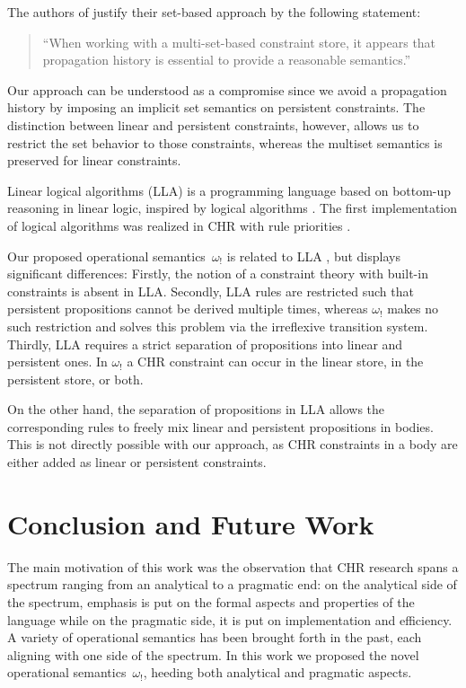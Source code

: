 \documentclass{tlp}
\newcommand{\bang}{\ensuremath{!}}
\newcommand{\obang}{\ensuremath{{\omega_\bang}}}
\begin{document}
The authors of \cite{Sarna-Starosta2007} justify their set-based approach by the
following statement:
\begin{quotation} 
``When working with a multi-set-based constraint store, it appears that
propagation history is essential to provide a reasonable semantics.''
\end{quotation}
Our approach can be understood as a compromise since we avoid
a propagation history by imposing an implicit set semantics on persistent
constraints. The distinction between linear and persistent
constraints, however, allows us to restrict the set behavior to those
constraints, whereas the multiset semantics is
preserved for linear constraints.

Linear logical algorithms \cite{Simmons2008} (LLA) is a programming language
based on bottom-up reasoning in linear logic, inspired by logical algorithms
\cite{Ganzinger2002}. The first implementation of logical algorithms was realized
in CHR with rule priorities \cite{DeKoninck2009}. 

Our proposed operational semantics~$\obang$ is related to LLA \cite{Simmons2008},
but displays significant differences: Firstly, the notion of a constraint theory
with built-in constraints is absent in LLA. Secondly, LLA rules are restricted
such that persistent propositions cannot be derived multiple times, whereas
$\obang$ makes no such restriction and solves this problem via the irreflexive
transition system. Thirdly, LLA requires a strict separation of propositions into
linear and persistent ones. In $\obang$ a CHR constraint can occur in the linear
store, in the persistent store, or both.

On the other hand, the separation of
propositions in LLA allows the corresponding rules to freely mix linear and persistent
propositions in bodies. This is not directly possible with our approach, as CHR
constraints in a body are either added as linear or persistent constraints.

\section{Conclusion and Future Work}
\label{sec:conclusion}

The main motivation of this work was the observation that CHR research spans a
spectrum ranging from an analytical to a pragmatic end: on the analytical side of
the spectrum, emphasis is put on the formal aspects and properties of the
language while on the pragmatic side, it is put on implementation and efficiency.
A variety of operational semantics has been brought forth in the past, each
aligning with one side of the spectrum. In this work we proposed the novel
operational semantics~$\obang$, heeding both analytical and pragmatic aspects.
\end{document}
